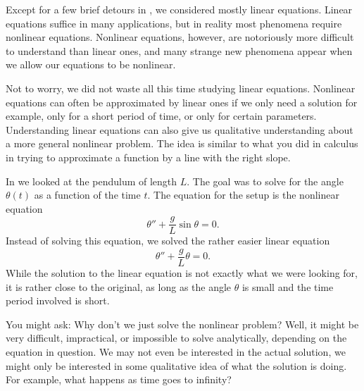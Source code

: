 \documentclass[12pt]{book}
\begin{document}


Except for a few brief detours in ,
we considered mostly linear
equations.  Linear equations suffice in many applications, but in reality
most phenomena require nonlinear equations.  Nonlinear equations, however,
are notoriously more difficult to understand than linear ones, and 
many strange new phenomena appear when we allow our equations to be
nonlinear.

Not to worry, we did not waste all this time studying linear equations.
Nonlinear equations can often be approximated by linear ones if we only need
a solution  for example, only for a short period of time, or
only for certain parameters.  Understanding linear equations can
also give us qualitative understanding about a more general nonlinear
problem.  The idea is similar to what you did in calculus in trying to
approximate a function by a line with the right slope.

\begin{diffyfloatingfigure}{1.45in}{1.75in}
\noindent
{}
\end{diffyfloatingfigure}
In  we looked at the pendulum of %
length $L$.  The goal was to solve for the angle $\theta(t)$ as
a function of the time $t$.  The equation for the setup is
the nonlinear equation
\begin{equation*}
\theta'' + \frac{g}{L} \sin \theta = 0 .
\end{equation*}
Instead of solving this equation, we solved the rather easier linear
equation
\begin{equation*}
\theta'' + \frac{g}{L} \theta = 0 .
\end{equation*}
While the solution to the linear equation is not exactly what we were
looking for, it is rather close to the original, as long as the
angle $\theta$ is small and the time period involved is short.

You might ask: Why don't we just solve the nonlinear problem?  Well, it
might be very difficult, impractical, or impossible to solve analytically,
depending on the equation in question.  We may
not even be interested in the actual solution, we might only be interested
in some qualitative idea of what the solution is doing.  For example,
what happens as time goes to infinity?
\end{document}
